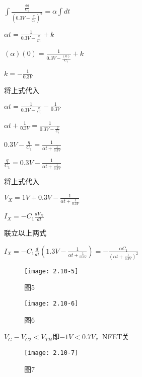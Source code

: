 $\int \frac{\frac{dq}{C_1}}{(0.3V-\frac{q}{C_1})^2}=\alpha \int dt$

$\alpha t=\frac{1}{0.3V-\frac{q}{C_1}}+k$

$(\alpha) (0)=\frac{1}{0.3V-\frac{(0)}{C_1}}+k$

$k=-\frac{1}{0.3V}$

将上式代入

$\alpha t=\frac{1}{0.3V-\frac{q}{C_1}}-\frac{1}{0.3V}$

$\alpha t+\frac{1}{0.3V}=\frac{1}{0.3V-\frac{q}{C_1}}$

$0.3V-\frac{q}{C_1}=\frac{1}{\alpha t+\frac{1}{0.3V}}$

$\frac{q}{C_1}=0.3V-\frac{1}{\alpha t+\frac{1}{0.3V}}$

将上式代入

$V_X=1V+0.3V-\frac{1}{\alpha t+\frac{1}{0.3V}}$

$I_X=-C_1\frac{dV_X}{dt}$

联立以上两式

$I_X=-C_1\frac{d}{dt}(1.3V-\frac{1}{\alpha t+\frac{1}{0.3V}})=-\frac{\alpha C_1}{(\alpha t+\frac{1}{0.3V})^2}$

\begin{figure}[H] %
	\begin{minipage}{\linewidth}
		\texttt{[image: 2.10-5]}
	\end{minipage}
	\caption*{图5} %
\end{figure}

\scalebox{3}{（c）}

\begin{figure}[H] %
	\begin{minipage}{\linewidth}
		\texttt{[image: 2.10-6]}
	\end{minipage}
	\caption*{图6} %
\end{figure}

$V_G-V_{C2}<V_{TH}$即$-1V<0.7V$，NFET关

\begin{figure}[H] %
	\begin{minipage}{\linewidth}
		\texttt{[image: 2.10-7]}
	\end{minipage}
	\caption*{图7} %
\end{figure}












